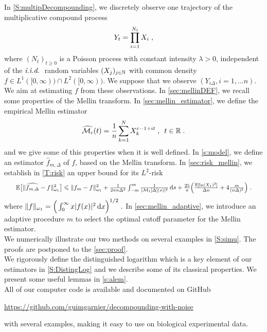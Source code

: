 In \cref{S:multipDecompounding}, we discretely observe one trajectory of the multiplicative compound process
\begin{equation}
    Y_t = \prod_{i = 1}^{N_t}X_i
    \; ,
    \label{multCompound_intro}
\end{equation}
where $(N_t)_{t \geq 0}$ is a Poisson process with constant intensity 
$\lambda > 0$, independent of the $\textit{i.i.d.}\;$ random variables $(X_j)_{j \in \mathbb{N}}$ with common density $f \in L^1([0, \infty)) \cap L^2([0, \infty))$. We suppose that we observe $(Y_{i\Delta}, i = 1, \ldots n)$. We aim at estimating $f$ from these observations. In \cref{sec:mellinDEF}, we recall some properties of the Mellin transform. In \cref{sec:mellin_estimator}, we define the empirical Mellin estimator 
\begin{equation*}
    \widehat{\mathcal{M}_c}(t) = \frac{1}{n} \sum_{k = 1}^{N} X_{k}^{c - 1 + it}
    \; , \enspace 
    t \in \mathbb{R}
    \; .
\end{equation*}
and we give some of this properties when it is well defined. In \cref{s:model}, we define an estimator $\hat f_{m, \Delta}$ of $f$, based on the Mellin transform. In \cref{sec:risk_mellin}, we establish in \cref{T:risk} an upper bound for its $L^2$-risk
\begin{equation*}
\resizebox{.95\hsize}{!}{$
    \EE \big[ \|\hat{f_{m, \Delta}}  - f \|_{\omega_1}^2\big] \leq \|f_m  - f \|_{\omega_1}^2 
    +
    \frac{1}{2\pi n \Delta^2} \int_{-m}^{m}\frac{1}{|\Mcal_1[\Delta](s)|^2}\diff s 
    + \frac{25}{\pi} \Big(\frac{\EE[\ln(X_1)^2]}{\Delta n} + 4 \frac{m}{(n \Delta)^{2}} \Big)
    \eqfinp
$}
\end{equation*}
where $
    \| f \|_{\omega_1} = \Big( \int_{0}^\infty x |f(x)|^2 \,\mathrm{d} x \Big)^{1/2}
    \; .$
In \cref{sec:mellin_adaptive}, we introduce an adaptive procedure $m$ to select the optimal cutoff parameter for the Mellin estimator. \\

We numerically illustrate our two methods on several examples in \cref{S:simu}.
The proofs are postponed to the \cref{sec:proof}. \\

We rigorously define the distinguished logarithm which is a key element of our estimators in \cref{S:DistingLog} and we describe some of its classical properties. We present some useful lemmas in \cref{s:alem}.\\

All of our computer code is available and documented on GitHub
 \begin{center}
\url{https://github.com/guimgarnier/decompounding-with-noise}
\end{center}
with several examples, making it easy to use on biological experimental data.\\



